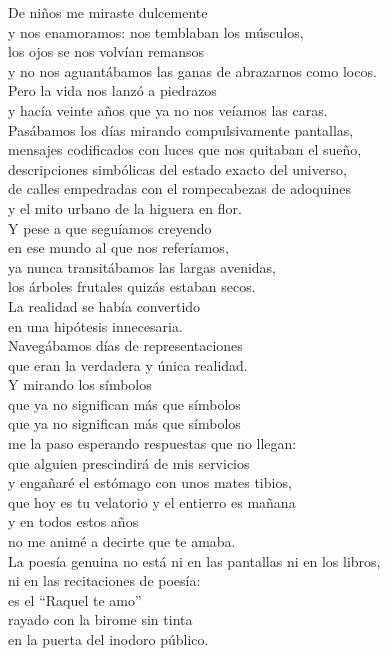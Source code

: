 

De niños me miraste dulcemente \\
y nos enamoramos: nos temblaban los músculos, \\
los ojos se nos volvían remansos \\
y no nos aguantábamos las ganas de abrazarnos como locos. \\
Pero la vida nos lanzó a piedrazos \\
y hacía veinte años que ya no nos veíamos las caras. \\
Pasábamos los días mirando compulsivamente pantallas, \\
mensajes codificados con luces que nos quitaban el sueño, \\
descripciones simbólicas del estado exacto del universo, \\
de calles empedradas con el rompecabezas de adoquines \\
y el mito urbano de la higuera en flor. \\
Y pese a que seguíamos creyendo \\
en ese mundo al que nos referíamos, \\
ya nunca transitábamos las largas avenidas, \\
los árboles frutales quizás estaban secos. \\
La realidad se había convertido \\
en una hipótesis innecesaria. \\
Navegábamos días de representaciones \\
que eran la verdadera y única realidad. \\
Y mirando los símbolos \\
que ya no significan más que símbolos \\
que ya no significan más que símbolos \\
me la paso esperando respuestas que no llegan: \\
que alguien prescindirá de mis servicios \\
y engañaré el estómago con unos mates tibios, \\
que hoy es tu velatorio y el entierro es mañana \\
y en todos estos años \\
no me animé a decirte que te amaba. \\
La poesía genuina no está ni en las pantallas ni en los libros, \\
ni en las recitaciones de poesía: \\
es el ``Raquel te amo'' \\
rayado con la birome sin tinta \\
en la puerta del inodoro público. \\

